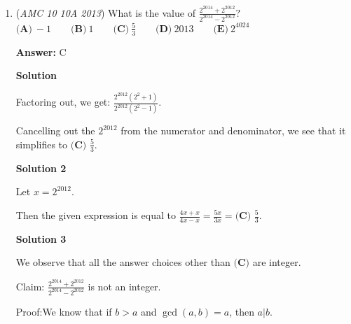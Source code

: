 \begin{enumerate}
 



\textbf{Solution 3}

Similar to Solution 1, note that for Case 2 of solution the answer is simply $\binom{4}2$ and for the first case it is $\binom{3}2$  hence $\boxed{\textbf{(C) }9}$ ways

 



\textbf{Solution 4}

There are $\binom{4}{2}$ ways to choose two courses given we have chosen English and Algebra; another $\binom{4}{2}$ ways to choose courses given we have English and Geometry. The total, $12$, counts the case with both Algebra and Geometry twice, so we subtract $\binom{3}{1} = 3$ - the number of ways to choose one course from History, Art, and Latin - from $12$ to get $\boxed{ \textbf{ (C) } 9 }$ ways.

 


 


	\item (\textit{AMC 10 10A 2013}) What is the value of $\frac{2^{2014}+2^{2012}}{2^{2014}-2^{2012}} ?$
$\textbf{(A)}\ -1 \qquad\textbf{(B)}\ 1  \qquad\textbf{(C)}\ \frac{5}{3} \qquad\textbf{(D)}\ 2013 \qquad\textbf{(E)}\ 2^{4024}$

 \textbf{Answer: }C



\textbf{Solution}

Factoring out, we get: $\frac{2^{2012}(2^2 + 1)}{2^{2012}(2^2-1)}$.  

 Cancelling out the $2^{2012}$ from the numerator and denominator, we see that it simplifies to $\boxed{\textbf{(C) }\frac{5}{3}}$.

 



\textbf{Solution 2}

Let $x=2^{2012}$.

 Then the given expression is equal to $\frac{4x+x}{4x-x}=\frac{5x}{3x}=\boxed{\textbf{(C) }\frac{5}{3}}$.

 



\textbf{Solution 3}

We observe that all the answer choices other than $\textbf{(C)}$ are integer.

 Claim: $\frac{2^{2014}+2^{2012}}{2^{2014}-2^{2012}}$ is not an integer.

 Proof:We know that if $b>a$ and $\operatorname{gcd}(a,b) = a$, then $a|b$.


\end{enumerate}
